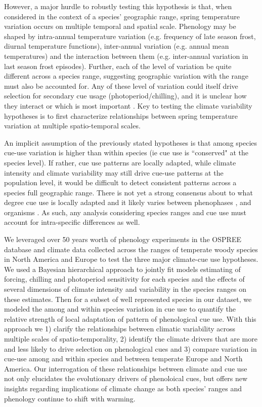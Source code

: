 \documentclass[12pt]{article}\usepackage[]{graphicx}\usepackage[]{color}
\begin{document}
However, a major hurdle to robustly testing this hypothesis is that, when considered in the context of a species' geographic range, spring temperature variation occurs on multiple temporal and spatial scale. Phenology may be shaped by intra-annual temperature variation (e.g. frequency of late season frost, diurnal temperature functions), inter-annual variation (e.g. annual mean temperatures) and the interaction between them (e.g. inter-annual variation in last season frost episodes). Further, each of the level of variation be quite different across a species range, suggesting geographic variation with the range must also be accounted for.
Any of these level of variation could itself drive selection for secondary cue usage (photoperiod/chilling), and it is unclear how they interact or which is most important \citep{Zagmajster:2014aa}. Key to testing the climate variability hypotheses is to first characterize relationships between spring temperature variation at multiple spatio-temporal scales.

\noindent An implicit assumption of the previously stated hypotheses is that among species cue-use variation is higher than within species (ie cue use is ``conserved" at the species level). If rather, cue use patterns are locally adapted, while climate intensity and climate variability may still drive cue-use patterns at the population level, it would be difficult to detect consistent patterns across a species full geographic range. There is not yet a strong consensus about to what degree cue use is locally adapted and it likely varies between phenophases \citep{}, and organisms \citep{}. As such, any analysis considering species ranges and cue use must account for intra-specific differences as well.

\noindent We leveraged over 50 years worth of phenology experiments in the OSPREE database \citep{wolkovich2019} and climate data collected across the ranges of temperate woody species in North America and Europe to test the three major climate-cue use hypotheses. We used a Bayesian hierarchical approach to jointly fit models estimating of forcing, chilling and photoperiod sensitivity for each species and the effects of several dimensions of climate intensity and variability in the species ranges on these estimates. Then for a subset of well represented species in our dataset, we modeled the among and within species variation in cue use to quantify the relative strength of local adaptation of pattern of phenological cue use. With this approach we 1) clarify the relationships between climatic variability across multiple scales of spatio-temporality, 2) identify the climate drivers that are more and less likely to drive selection on phenological cues and 3) compare variation in cue-use among and within species and between temperate Europe and North America. Our interrogation of these relationships between climate and cue use not only elucidates the evolutionary drivers of phenoloical cues, but offers new insights regarding implications of climate change as both species' ranges and phenology continue to shift with warming.
\end{document}
